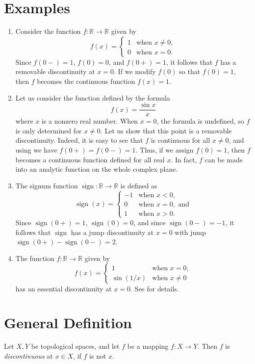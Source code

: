 \documentclass[12pt]{article}
\newcommand{\sR}[0]{\mathbb{R}}
\begin{document}
 \section*{ Examples}
\begin{enumerate}
\item Consider the function $f:\sR\to \sR$ given by
\[
f(x)=\begin{cases} 
 1 & \text{when }x\neq 0, \\
 0 & \text{when }x=0.  
\end{cases}
\]
Since $f(0-)=1$, $f(0)=0$, and $f(0+)=1$,
it follows that $f$ has a removable discontinuity at $x=0$. 
If we modify $f(0)$ so that $f(0)=1$, then $f$ becomes the 
continuous function $f(x)=1$. 
\item Let us consider the function defined by the formula 
\[
f(x) = \frac{\sin x }{x}
\]
where $x$ is a nonzero real number. When $x=0$, the formula is undefined, so 
$f$ is only determined for $x\neq 0$. Let us show that this point is
a removable discontinuity. Indeed, it is easy 
to see that $f$ is continuous for all $x\neq 0$, and using 
 we have $f(0+)=f(0-)=1$. 
Thus, if we assign $f(0)=1$, then $f$ becomes a continuous function
defined for all real $x$.  In fact, $f$ can be made into an analytic 
function on the whole complex plane. 
\newcommand{\signum}[0]{\mathop{\mathrm{sign}}}
\item  The signum function $\signum\colon\sR\to \sR$ is defined as
\[
 \signum (x) =\begin{cases} 
 -1 & \text{when }x<0, \\
 0 & \text{when } x=0, \text{ and}\\
 1 & \text{when } x>0. 
\end{cases}
\]
Since $\signum(0+)=1$, $\signum(0)=0$, and since $\signum(0-)=-1$,
it follows that $\signum$ has a jump discontinuity at $x=0$
with jump $\signum(0+)-\signum(0-)=2$.
\item The function $f:\sR\to\sR$ given by
\[
f(x) =\begin{cases}
 1 & \text{when }x= 0, \\
 \sin(1/x) & \text{when } x\neq 0
\end{cases}
\]
has an essential discontinuity at $x=0$.  See \cite{contline} for details.
\end{enumerate} 
 
\section*{General Definition} Let $X,Y$ be topological spaces, and let $f$ be a mapping
 $f:X\to Y$. Then $f$ is \emph{discontinuous} at $x\in X$, if $f$ is not
  $x$.
\end{document}

